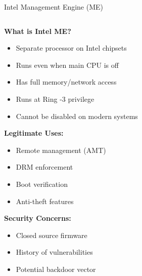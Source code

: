 \documentclass[aspectratio=169,12pt]{beamer}
\begin{document}
\begin{frame}{Intel Management Engine (ME)}
    \begin{columns}
        \begin{column}{0.5\textwidth}
            \textbf{What is Intel ME?}
            \begin{itemize}
                \item Separate processor on Intel chipsets
                \item Runs even when main CPU is off
                \item Has full memory/network access
                \item Runs at Ring -3 privilege
                \item Cannot be disabled on modern systems
            \end{itemize}
            
            \vspace{0.3cm}
            \textbf{Legitimate Uses:}
            \begin{itemize}
                \item Remote management (AMT)
                \item DRM enforcement
                \item Boot verification
                \item Anti-theft features
            \end{itemize}
            
            \vspace{0.3cm}
            \textbf{Security Concerns:}
            \begin{itemize}
                \item Closed source firmware
                \item History of vulnerabilities
                \item Potential backdoor vector
            \end{itemize}
        \end{column}
        \begin{column}{0.5\textwidth}
\end{column}
\end{columns}
\end{frame}
\end{document}
